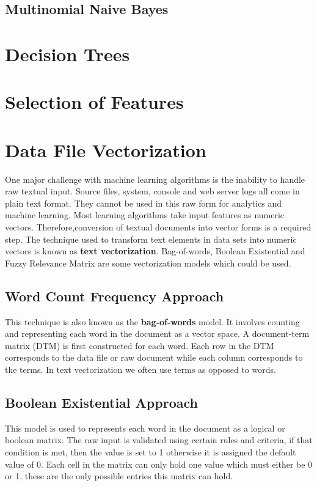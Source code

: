 \documentclass[12pt, letterpaper, titlepage]{report}
\begin{document}
\subsection{Multinomial Naive Bayes}



\section{Decision Trees}
\section{Selection of Features}
\section{Data File Vectorization}
One major challenge with machine learning algorithms is the inability to handle raw textual input. Source files, system, console and web server logs all come in plain text format. They cannot be used in this raw form for analytics and machine learning. Most learning algorithms take input features as numeric vectors. Therefore,conversion of textual documents into vector forms is a required step. The technique used to transform text elements in data sets into numeric vectors is known as \textbf{text vectorization}. Bag-of-words, Boolean Existential and Fuzzy Relevance Matrix are some vectorization models which could be used.
\subsection{Word Count Frequency Approach}
This technique is also known as the \textbf{bag-of-words} model. It involves counting and representing each word in the document as a vector space. A document-term matrix (DTM) is first constructed for each word. Each row in the DTM corresponds to the data file or raw document while each column corresponds to the terms. In text vectorization we often use terms as opposed to words.
\subsection{Boolean Existential Approach}
This model is used to represents each word in the document as a logical or boolean matrix. The raw input is validated using certain rules and criteria, if that condition is met, then the value is set to 1 otherwise it is assigned the default value of 0. Each cell in the matrix can only hold one value which must either be 0 or 1, these are the only possible entries this matrix can hold.
\end{document}
